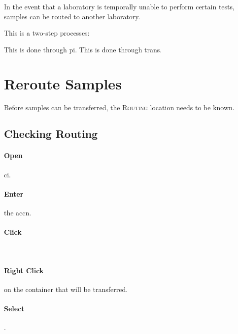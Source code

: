 In the event that a laboratory is temporally unable to perform certain tests, samples can be routed to another laboratory.

This is a two-step processes:
\begin{itemize}
     This is done through \gls{pi}.
     This is done through \gls{trans}.
\end{itemize}

\section{Reroute Samples}

Before samples can be transferred, the \textsc{Routing} location needs to be known.

\subsection{Checking Routing}\label{ss:check_routing}

\paragraph{Open}  \gls{ci}.

\paragraph{Enter} the \gls{accn}.

\paragraph{Click} \\


\paragraph{Right Click} on the container that will be transferred.

\paragraph{Select} .\\


